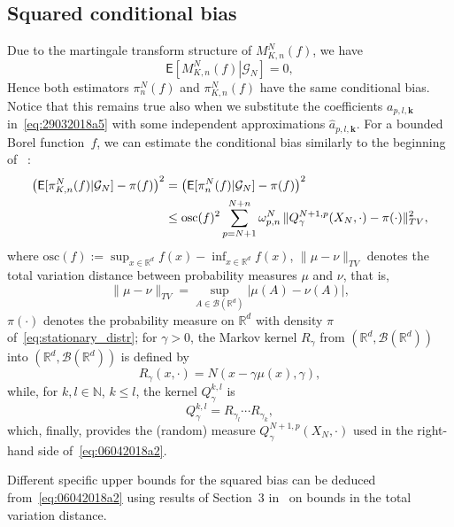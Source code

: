 \documentclass[article]{elsarticle}
\begin{document}
\subsection{Squared conditional bias}
Due to the martingale transform structure
of $M_{K,n}^N(f)$,
we have
\[
\mathsf E\left[\left.M_{K,n}^N(f)\right|\mathcal G_N\right]=0,
\]
Hence both estimators
$\pi_n^N(f)$ and $\pi_{K,n}^N(f)$ have the same conditional bias.
Notice that this remains true also when we substitute
the coefficients $a_{p,l,\mathbf{k}}$ in~\eqref{eq:29032018a5}
with some independent approximations $\widehat a_{p,l,\mathbf{k}}.$ For a bounded Borel function~$f$,
we can estimate the conditional bias
similarly to the beginning of ~\cite[Section~4]{durmus:moulines:2017}:
\begin{align}
\left(\mathsf{E}[\pi_{K,n}^N(f)|\mathcal G_N]-\pi(f)\right)^2
&=\left(\mathsf{E}[\pi_{n}^N(f)|\mathcal G_N]-\pi(f)\right)^2
\label{eq:06042018a2}\\
&\le
\mathrm{osc}(f)^2
\sum_{p=N+1}^{N+n}
\omega_{p,n}^N\,
\|Q_\gamma^{N+1,p}(X_N,\cdot)-\pi(\cdot)\|_{TV}^2,
\notag
\end{align}
where
$\mathrm{osc}(f):=\sup_{x\in\mathbb R^d}f(x)-\inf_{x\in\mathbb R^d}f(x)$,
$\|\mu-\nu\|_{TV}$ denotes the total variation distance
between probability measures $\mu$ and $\nu$, that is,
$$
\|\mu-\nu\|_{TV}=\sup_{A\in\mathcal B(\mathbb R^d)}
|\mu(A)-\nu(A)|,
$$
$\pi(\cdot)$ denotes the probability measure on $\mathbb R^d$
with density $\pi$ of~\eqref{eq:stationary_distr};
for $\gamma>0$, the Markov kernel $R_\gamma$
from $(\mathbb R^d,\mathcal B(\mathbb R^d))$
into $(\mathbb R^d,\mathcal B(\mathbb R^d))$
is defined by
$$
R_\gamma(x,\cdot)=N\left(x-\gamma\mu(x),\gamma\right),
$$
while, for $k,l\in\mathbb N$, $k\le l$,
the kernel $Q_\gamma^{k,l}$ is
$$
Q_\gamma^{k,l}=R_{\gamma_l}\cdots R_{\gamma_k},
$$
which, finally, provides the (random) measure
$Q_\gamma^{N+1,p}(X_N,\cdot)$
used in the right-hand side of~\eqref{eq:06042018a2}.

Different specific upper bounds for the squared bias
can be deduced from~\eqref{eq:06042018a2}
using results of Section~3 in~\cite{durmus:moulines:2017}
on bounds in the total variation distance.
\end{document}
